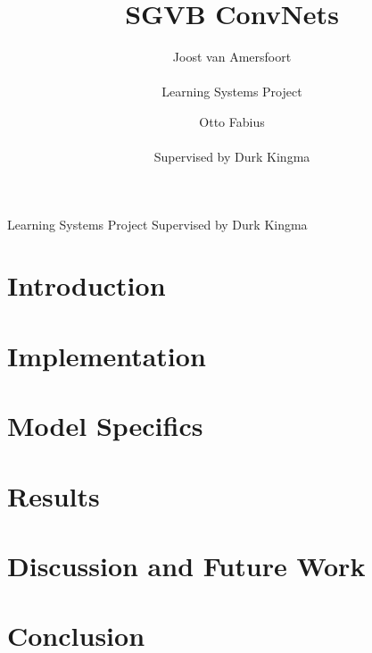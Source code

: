 \documentclass{article}
\title{SGVB ConvNets}
\author{Joost van Amersfoort \\ \\ Learning Systems Project \and Otto Fabius \\ \\ Supervised by Durk Kingma}
\begin{document}
\maketitle
\hspace{25mm} Learning Systems Project\hspace{20mm} Supervised by Durk Kingma
\tableofcontents
\newpage

\section{Introduction}


\section{Implementation}\label{implementation}


\section{Model Specifics}\label{model_specs}


\section{Results}\label{results}


\section{Discussion and Future Work}\label{discussion}


\section{Conclusion}\label{conclusion}


\pagebreak 
\nocite{*}


\end{document}
